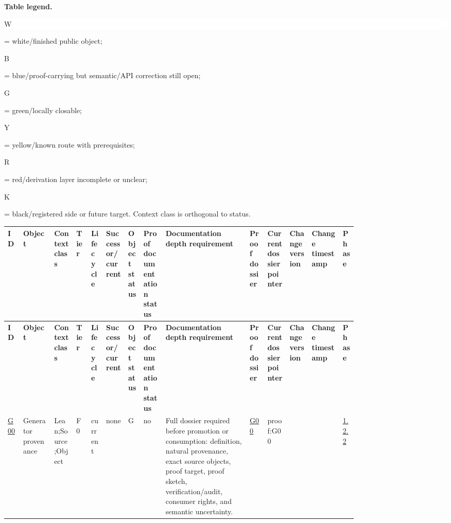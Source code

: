 \footnotesize
\par\smallskip\noindent\begin{minipage}{0.99\linewidth}\footnotesize\raggedright\textbf{Table legend.} \colorbox{white}{\strut W} = white/finished public object; \colorbox{cyan!20}{\strut B} = blue/proof-carrying but semantic/API correction still open; \colorbox{green!18}{\strut G} = green/locally closable; \colorbox{yellow!25}{\strut Y} = yellow/known route with prerequisites; \colorbox{red!20}{\strut R} = red/derivation layer incomplete or unclear; \colorbox{black!18}{\strut K} = black/registered side or future target. Context class is orthogonal to status.\end{minipage}\par\vspace{0.25em}
\begin{longtable}{L{0.02\linewidth} L{0.078\linewidth} L{0.058\linewidth} L{0.028\linewidth} L{0.038\linewidth} L{0.05\linewidth} L{0.024\linewidth} L{0.058\linewidth} L{0.19\linewidth} L{0.045\linewidth} L{0.05\linewidth} L{0.052\linewidth} L{0.076\linewidth} L{0.02\linewidth}}
\hline
\textbf{ID} & \textbf{Object} & \textbf{Context class} & \textbf{Tier} & \textbf{Lifecycle} & \textbf{Successor/\allowbreak{}current} & \textbf{Object status} & \textbf{Proof documentation status} & \textbf{Documentation depth requirement} & \textbf{Proof dossier} & \textbf{Current dossier pointer} & \textbf{Change version} & \textbf{Change timestamp} & \textbf{Phase}\\
\hline
\endfirsthead
\hline
\textbf{ID} & \textbf{Object} & \textbf{Context class} & \textbf{Tier} & \textbf{Lifecycle} & \textbf{Successor/\allowbreak{}current} & \textbf{Object status} & \textbf{Proof documentation status} & \textbf{Documentation depth requirement} & \textbf{Proof dossier} & \textbf{Current dossier pointer} & \textbf{Change version} & \textbf{Change timestamp} & \textbf{Phase}\\
\hline
\endhead
\hyperlink{object-row-G00}{G00} & Generator provenance & Lean;\newline Source;\newline Object & F0 & current & none & G & no & Full dossier required before promotion or consumption: definition, natural provenance, exact source objects, proof target, proof sketch, verification/\allowbreak{}audit, consumer rights, and semantic uncertainty. & \hyperlink{objproof:G00}{G00} & proof:G00 &  &  & \hyperlink{phase-row-1-2-2}{1.2.2}\\

\end{longtable}
